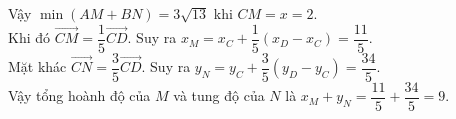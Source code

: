 \begin{bt}
{\begin{center}
		\end{center}
		Vậy $\min(AM+BN)=3\sqrt{13}$ khi $CM=x=2$.\\ 
		Khi đó $\overrightarrow{CM}=\dfrac{1}{5}\overrightarrow{CD}$. Suy ra $x_M=x_C+\dfrac{1}{5}(x_D-x_C)=\dfrac{11}{5}$.\\ 
		Mặt khác  $\overrightarrow{CN}=\dfrac{3}{5}\overrightarrow{CD}$. Suy ra $y_N=y_C+\dfrac{3}{5}(y_D-y_C)=\dfrac{34}{5}$.\\
		Vậy tổng hoành độ của $M$ và tung độ của $N$  là $x_M+y_N=\dfrac{11}{5}+\dfrac{34}{5}=9$.
	 }
\end{bt}

